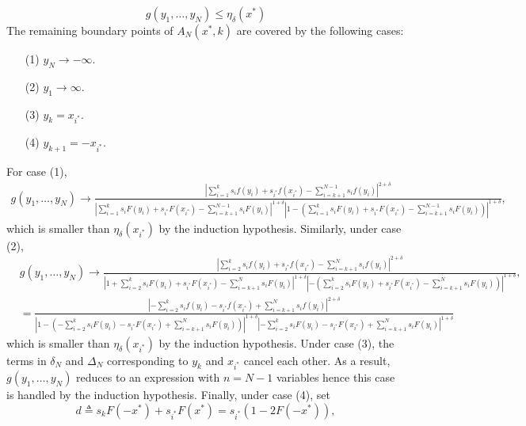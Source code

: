 \begin{proof-of-lemma}[\ref{lem:bound_intervals_delta}]
\begin{equation*}
    g(y_1,\ldots,y_N) \leq \eta_{\delta}(x^*)
  \end{equation*}
  The remaining boundary points of $A_N(x^*,k)$ are covered by the following cases:
  \begin{itemize}
  \item[(1)]  $y_N \to -\infty$. 
  \item[(2)] $y_1 \to \infty$.
  \item[(3)] $y_k = x_{i^*}$.
  \item[(4)] $y_{k+1} = -x_{i^*}$. 
  \end{itemize}
  For case (1), 
  \begin{align*}
    g(y_1,\ldots,y_N) \to \frac{ \left| \sum_{i=1}^{k} s_i f(y_i) + s_{i^*} f(x_{i^*}) - \sum_{i=k+1}^{N-1} s_i f(y_i) \right|^{2+\delta}} 
    {\left| \sum_{i=1}^{k} s_i F(y_i) + s_{i^*} F(x_{i^*}) - \sum_{i=k+1}^{N-1} s_i F(y_i) \right|^{1+\delta}\left|1- \left( \sum_{i=1}^{k} s_i F(y_i) + s_{i^*} F(x_{i^*}) - \sum_{i=k+1}^{N-1} s_i F(y_i) \right)  \right|^{1+\delta} },
  \end{align*}
  which is smaller than $\eta_\delta(x_{i^*})$ by the induction hypothesis. Similarly, under case (2),
  \begin{align*}
    & g(y_1,\ldots,y_N) \to 
    \frac{ \left| \sum_{i=2}^{k} s_i f(y_i) + s_{i^*} f(x_{i^*}) - \sum_{i=k+1}^{N} s_i f(y_i) \right|^{2+\delta}} 
         {\left| 1+ \sum_{i=2}^{k} s_i F(y_i) + s_{i^*} F(x_{i^*}) - \sum_{i=k+1}^{N} s_i F(y_i) \right|^{1+\delta}\left|-\left( \sum_{i=2}^{k} s_i F(y_i) + s_{i^*} F(x_{i^*}) - \sum_{i=k+1}^{N} s_i F(y_i) \right)  \right|^{1+\delta} },
         \\
         & = \frac{ \left| -\sum_{i=2}^{k} s_i f(y_i) - s_{i^*} f(x_{i^*}) + \sum_{i=k+1}^{N} s_i f(y_i) \right|^{2+\delta}} 
           { \left|1 - \left(-\sum_{i=2}^{k} s_i F(y_i) - s_{i^*} F(x_{i^*}) + \sum_{i=k+1}^{N} s_i F(y_i) \right) \right|^{1+\delta} 
             \left|-\sum_{i=2}^{k} s_i F(y_i) - s_{i^*} F(x_{i^*}) + \sum_{i=k+1}^{N} s_i F(y_i) \right|^{1+\delta} }
  \end{align*}
  which is smaller than $\eta_{\delta}(x_{i^*})$ by the induction hypothesis. Under case (3), the terms in $\delta_N$ and $\Delta_N$ corresponding to $y_k$ and $x_{i^*}$ cancel each other. As a result,  $g(y_1,\ldots,y_N)$ reduces to an expression with $n=N-1$ variables hence this case is handled by the induction hypothesis. 
  Finally, under case (4), set 
  \begin{equation*}
    d \triangleq s_k F(-x^*) + s_{i^*} F(x^*) = s_{i^*}\left(1-2F(-x^*) \right), 

\end{equation*}
\end{proof-of-lemma}
